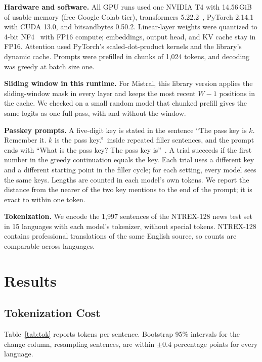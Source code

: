 \documentclass[conference]{IEEEtran}
\begin{document}
\textbf{Hardware and software.} All GPU runs used one NVIDIA T4 with 14.56\,GiB of usable memory (free Google Colab tier), transformers 5.22.2~\cite{transformers}, PyTorch 2.14.1~\cite{pytorch} with CUDA 13.0, and bitsandbytes 0.50.2. Linear-layer weights were quantized to 4-bit NF4~\cite{qlora} with FP16 compute; embeddings, output head, and KV cache stay in FP16. Attention used PyTorch's scaled-dot-product kernels and the library's dynamic cache. Prompts were prefilled in chunks of 1,024 tokens, and decoding was greedy at batch size one.

\textbf{Sliding window in this runtime.} For Mistral, this library version applies the sliding-window mask in every layer and keeps the most recent $W-1$ positions in the cache. We checked on a small random model that chunked prefill gives the same logits as one full pass, with and without the window.

\textbf{Passkey prompts.} A five-digit key is stated in the sentence ``The pass key is $k$. Remember it. $k$ is the pass key.''\ inside repeated filler sentences, and the prompt ends with ``What is the pass key? The pass key is''~\cite{landmark}. A trial succeeds if the first number in the greedy continuation equals the key. Each trial uses a different key and a different starting point in the filler cycle; for each setting, every model sees the same keys. Lengths are counted in each model's own tokens. We report the distance from the nearer of the two key mentions to the end of the prompt; it is exact to within one token.

\textbf{Tokenization.} We encode the 1,997 sentences of the NTREX-128 news test set~\cite{ntrex} in 15 languages with each model's tokenizer, without special tokens. NTREX-128 contains professional translations of the same English source, so counts are comparable across languages.

\section{Results}
\subsection{Tokenization Cost}
\label{sec:tok}
Table~\ref{tab:tok} reports tokens per sentence. Bootstrap 95\% intervals for the change column, resampling sentences, are within $\pm0.4$ percentage points for every language.
\end{document}
